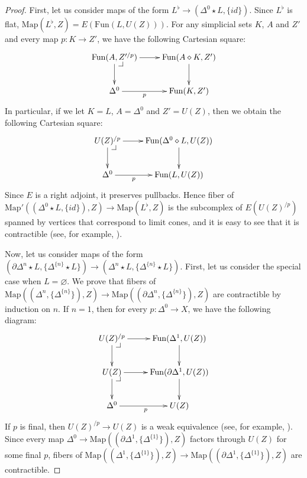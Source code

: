 \documentclass[reqno]{amsart}
\makeatletter
\theoremstyle{definition}
\theoremstyle{remark}
\newcommand{\join}{\star}
\newcommand{\fjoin}{\diamond}
\newcommand{\Map}{\mathrm{Map}}
\newcommand{\Fun}{\mathrm{Fun}}
\numberwithin{figure}{section}
\newcommand{\pb}[1][dr]{\save*!/#1-1.2pc/#1:(-1,1)@^{|-}\restore}
\makeatother
\begin{document}
\begin{proof}
First, let us consider maps of the form $L^\flat \to (\Delta^0 \join L, \{ id \})$.
Since $L^\flat$ is flat, $\Map(L^\flat,Z) = E(\Fun(L,U(Z)))$.
For any simplicial sets $K$, $A$ and $Z'$ and every map $p : K \to Z'$, we have the following Cartesian square:
\[ \xymatrix{ \Fun(A,Z'^{/p}) \ar[r] \ar[d] \pb & \Fun(A \fjoin K, Z') \ar[d] \\
              \Delta^0 \ar[r]_-p & \Fun(K,Z')
            } \]
In particular, if we let $K = L$, $A = \Delta^0$ and $Z' = U(Z)$, then we obtain the following Cartesian square:
\[ \xymatrix{ U(Z)^{/p} \ar[r] \ar[d] \pb & \Fun(\Delta^0 \fjoin L, U(Z)) \ar[d] \\
              \Delta^0 \ar[r]_-p & \Fun(L,U(Z))
            } \]
Since $E$ is a right adjoint, it preserves pullbacks.
Hence fiber of $\Map'((\Delta^0 \join L, \{ id \}), Z) \to \Map(L^\flat, Z)$ is the subcomplex of $E(U(Z)^{/p})$
spanned by vertices that correspond to limit cones, and it is easy to see that it is contractible (see, for example, \cite[Lemma~2.11]{szumilo}).

Now, let us consider maps of the form $(\partial \Delta^n \join L, \{ \Delta^{\{n\}} \join L \}) \to (\Delta^n \join L, \{ \Delta^{\{n\}} \join L \})$.
First, let us consider the special case when $L = \varnothing$.
We prove that fibers of $\Map((\Delta^n, \{ \Delta^{\{n\}} \}), Z) \to \Map((\partial \Delta^n, \{ \Delta^{\{n\}} \}), Z)$ are contractible by induction on $n$.
If $n = 1$, then for every $p : \Delta^0 \to X$, we have the following diagram:
\[ \xymatrix{ U(Z)^{/p} \ar[d] \ar[r] \pb & \Fun(\Delta^1, U(Z)) \ar[d] \\
              U(Z) \ar[d] \ar[r] \pb & \Fun(\partial \Delta^1, U(Z)) \ar[d] \\
              \Delta^0 \ar[r]_p & U(Z)
            } \]
If $p$ is final, then $U(Z)^{/p} \to U(Z)$ is a weak equivalence (see, for example, \cite[Corollary~1.2.12.5]{lurie-topos}).
Since every map $\Delta^0 \to \Map((\partial \Delta^1, \{ \Delta^{\{1\}} \}), Z)$ factors through $U(Z)$ for some final $p$,
fibers of $\Map((\Delta^1, \{ \Delta^{\{1\}} \}), Z) \to \Map((\partial \Delta^1, \{ \Delta^{\{1\}} \}), Z)$ are contractible.


\end{proof}
\end{document}
